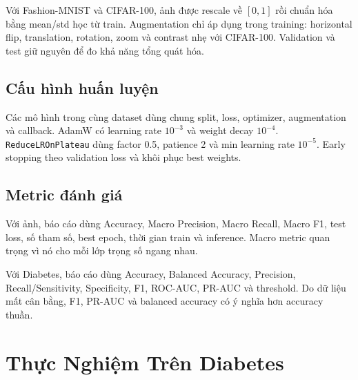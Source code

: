 \documentclass[12pt,a4paper]{report}
\begin{document}
Với Fashion-MNIST và CIFAR-100, ảnh được rescale về $[0,1]$ rồi chuẩn hóa bằng mean/std học từ train.
Augmentation chỉ áp dụng trong training: horizontal flip, translation, rotation, zoom và contrast nhẹ với CIFAR-100.
Validation và test giữ nguyên để đo khả năng tổng quát hóa.

\section{Cấu hình huấn luyện}
Các mô hình trong cùng dataset dùng chung split, loss, optimizer, augmentation và callback.
AdamW có learning rate $10^{-3}$ và weight decay $10^{-4}$.
\texttt{ReduceLROnPlateau} dùng factor 0.5, patience 2 và min learning rate $10^{-5}$.
Early stopping theo validation loss và khôi phục best weights.

\begin{table}[H]
\centering
\caption{Cấu hình huấn luyện theo dataset}
\label{tab:training_config}
\end{table}

\section{Metric đánh giá}
Với ảnh, báo cáo dùng Accuracy, Macro Precision, Macro Recall, Macro F1, test loss, số tham số, best epoch, thời gian train và inference.
Macro metric quan trọng vì nó cho mỗi lớp trọng số ngang nhau.

Với Diabetes, báo cáo dùng Accuracy, Balanced Accuracy, Precision, Recall/Sensitivity, Specificity, F1, ROC-AUC, PR-AUC và threshold.
Do dữ liệu mất cân bằng, F1, PR-AUC và balanced accuracy có ý nghĩa hơn accuracy thuần.

\chapter{Thực Nghiệm Trên Diabetes}
\end{document}
